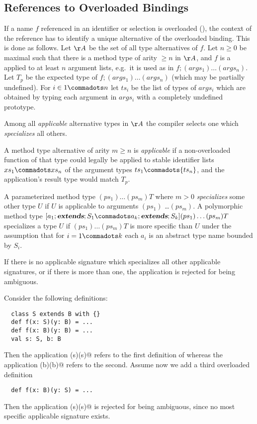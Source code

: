 \documentclass[11pt]{report}
\begin{document}
\begin{itemize}
\subsection{References to Overloaded Bindings}
\label{sec:overloaded-refs}

If a name $f$ referenced in an identifier or selection is overloaded
(), the context of the reference has to
identify a unique alternative of the overloaded binding. This is done
as follows. Let $\AA$ be the set of all type alternatives of $f$. Let
$n \geq 0$ be maximal such that there is a method type of arity $\geq
n$ in $\AA$, and $f$ is a applied to at least $n$ argument lists,
e.g.\ it is used as in $f;(args_1) \ldots (args_n)$.  Let $T_p$ be the
expected type of $f;(args_1) \ldots (args_n)$ (which may be partially
undefined).  For $i \in 1 \commadots n$ let ${ts_i}$ be the list of
types of ${args_i}$ which are obtained by typing each argument in
${args_i}$ with a completely undefined prototype.

Among all {\em applicable} alternative types in $\AA$ the compiler
selects one which {\em specializes} all others.

A method type alternative of arity $m \geq n$ is {\em applicable} if a
non-overloaded function of that type could legally be applied to
stable identifier lists ${xs_1} \commadots xs_n$ of the argument types
${ts_1}
\commadots {ts_n}$, and the application's result type would match
$T_p$.

A parameterized method type $(ps_1)
\ldots (ps_m) T$ where $m > 0$ {\em specializes} some other
type $U$ if $U$ is applicable to arguments $(ps_1)$ \ldots $(ps_m)$.
A polymorphic method type $[a_1
\extends S_1
\commadots a_k \extends S_k] (ps_1) \ldots (ps_m) T$ specializes
a type $U$ if $(ps_1) \ldots (ps_m) T$ is more
specific than $U$ under the assumption that for $i = 1 \commadots k$
each $a_i$ is an abstract type name bounded by $S_i$.

If there is no applicable signature which specializes all other
applicable signatures, or if there is more than one, the application
is rejected for being ambiguous.

\example Consider the following definitions:

\begin{verbatim}
  class S extends B with {}
  def f(x: S)(y: B) = ...
  def f(x: B)(y: B) = ...
  val s: S, b: B
\end{verbatim}
Then the application \verb@f(s)(s)@ refers to the first
definition of \verb@f@ whereas the application \verb@f(b)(b)@
refers to the second.  Assume now we add a third overloaded definition
\begin{verbatim}
  def f(x: B)(y: S) = ...
\end{verbatim}
Then the application \verb@f(s)(s)@ is rejected for being ambiguous, since
 no most specific applicable signature exists.


\end{itemize}
\end{document}
